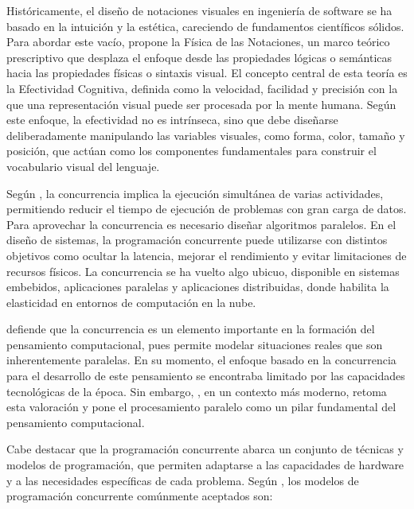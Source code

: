 
Históricamente, el diseño de notaciones visuales en ingeniería de software se ha basado en la intuición y la estética, careciendo de fundamentos científicos sólidos. Para abordar este vacío,  propone la Física de las Notaciones, un marco teórico prescriptivo que desplaza el enfoque desde las propiedades lógicas o semánticas hacia las propiedades físicas o sintaxis visual. El concepto central de esta teoría es la Efectividad Cognitiva, definida como la velocidad, facilidad y precisión con la que una representación visual puede ser procesada por la mente humana. Según este enfoque, la efectividad no es intrínseca, sino que debe diseñarse deliberadamente manipulando las variables visuales, como forma, color, tamaño y posición, que actúan como los componentes fundamentales para construir el vocabulario visual del lenguaje.


Según , la concurrencia implica la ejecución simultánea de varias actividades, permitiendo reducir el tiempo de ejecución de problemas con gran carga de datos. Para aprovechar la concurrencia es necesario diseñar algoritmos paralelos. En el diseño de sistemas, la programación concurrente puede utilizarse con distintos objetivos como ocultar la latencia, mejorar el rendimiento y evitar limitaciones de recursos físicos. La concurrencia se ha vuelto algo ubicuo, disponible en sistemas embebidos, aplicaciones paralelas y aplicaciones distribuidas, donde habilita la elasticidad en entornos de computación en la nube.

 defiende que la concurrencia es un elemento importante en la formación del pensamiento computacional, pues permite modelar situaciones reales que son inherentemente paralelas. En su momento, el enfoque basado en la concurrencia para el desarrollo de este pensamiento se encontraba limitado por las capacidades tecnológicas de la época. Sin embargo, , en un contexto más moderno, retoma esta valoración y pone el procesamiento paralelo como un pilar fundamental del pensamiento computacional.

Cabe destacar que la programación concurrente abarca un conjunto de técnicas y modelos de programación, que permiten adaptarse a las capacidades de hardware y a las necesidades específicas de cada problema. Según , los modelos de programación concurrente comúnmente aceptados son:

